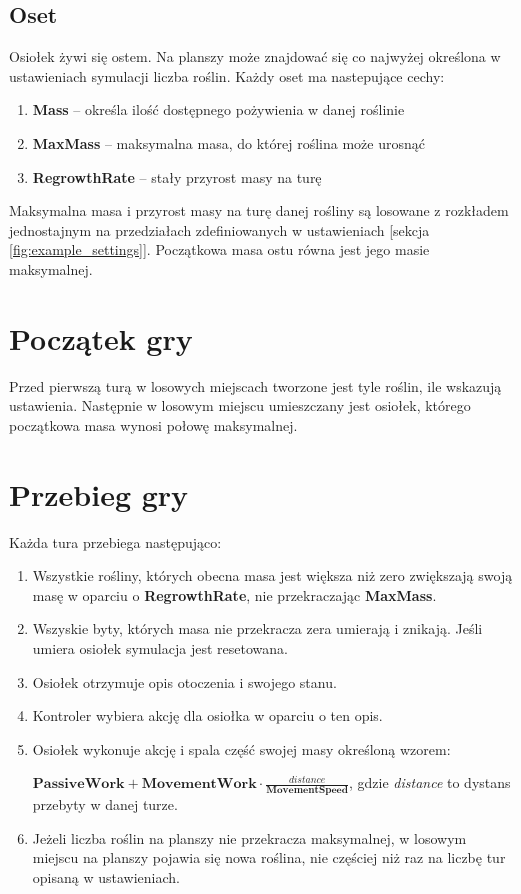 \subsection{Oset}
Osiołek żywi się ostem. Na planszy może znajdować się co najwyżej określona w ustawieniach symulacji liczba roślin. Każdy oset ma nastepujące cechy:
\begin{enumerate}    
    \item \textbf{Mass} -- określa ilość dostępnego pożywienia w danej roślinie
    \item \textbf{MaxMass} -- maksymalna masa, do której roślina może urosnąć
    \item \textbf{RegrowthRate} -- stały przyrost masy na turę
\end{enumerate}
Maksymalna masa i przyrost masy na turę danej rośliny są losowane z rozkładem jednostajnym na przedziałach zdefiniowanych w ustawieniach [sekcja \ref{fig:example_settings}]. Początkowa masa ostu równa jest jego masie maksymalnej.

\section{Początek gry}
Przed pierwszą turą w losowych miejscach tworzone jest tyle roślin, ile wskazują ustawienia. Następnie w losowym miejscu umieszczany jest osiołek, którego początkowa masa wynosi połowę maksymalnej.

\section{Przebieg gry}
Każda tura przebiega następująco:
\begin{enumerate}    
    \item Wszystkie rośliny, których obecna masa jest większa niż zero zwiększają swoją masę w oparciu o \textbf{RegrowthRate}, nie przekraczając \textbf{MaxMass}.
    \item Wszyskie byty, których masa nie przekracza zera umierają i znikają. Jeśli umiera osiołek symulacja jest resetowana.
    \item Osiołek otrzymuje opis otoczenia i swojego stanu.
    \item Kontroler wybiera akcję dla osiołka w oparciu o ten opis.
    \item Osiołek wykonuje akcję i spala część swojej masy określoną wzorem:

     $\textbf{PassiveWork} + \textbf{MovementWork} \cdot \frac{\textit{distance}}{\textbf{MovementSpeed}}$, gdzie \textit{distance} to dystans przebyty w danej turze.
    \item Jeżeli liczba roślin na planszy nie przekracza maksymalnej, w losowym miejscu na planszy pojawia się nowa roślina, nie częściej niż raz na liczbę tur opisaną w ustawieniach.
\end{enumerate}

